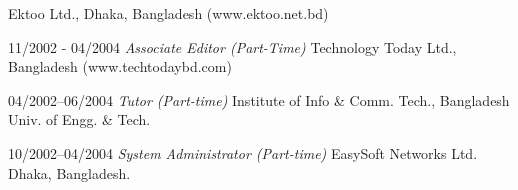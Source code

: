 \documentclass[notopicbreak,contbibnum,plain]{simplecv}
\begin{document}
\begin{topic}
	Ektoo Ltd., Dhaka, Bangladesh (\small www.ektoo.net.bd)
\vspace*{-0.1cm}
 \normalsize 
	\item[11/2002 - 04/2004] \textit{Associate Editor (Part-Time)}
	Technology Today Ltd., Bangladesh (\small www.techtodaybd.com)
\vspace*{-0.1cm}
 \normalsize 
	\item[04/2002--06/2004] \textit{Tutor (Part-time)}
	 Institute of Info \& Comm. Tech.,
	Bangladesh Univ. of Engg. \& Tech.
\vspace*{-0.2cm}
 \normalsize 
	\item[10/2002--04/2004] \textit{System Administrator (Part-time)}
	 EasySoft Networks Ltd. Dhaka, Bangladesh.
\end{topic}
\end{document}
